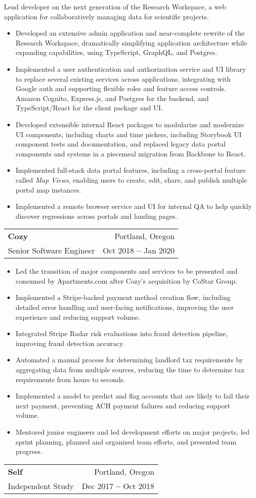\documentclass[letterpaper,11pt]{article}
\makeatletter
\newcommand{\resumeItem}[1]{
  \item\small{
    {#1 \vspace{-2pt}}
  }
}
\newcommand{\resumeSubheading}[4]{
  \item
    \begin{tabular*}{0.97\textwidth}[t]{l@{\extracolsep{\fill}}r}
      \normalsize \textbf{#1} & \small#2 \\
      \small #3 & \small #4 \\
    \end{tabular*}\vspace{-5pt}
}
\newcommand{\resumeItemListStart}{\begin{itemize}}
\newcommand{\resumeItemListEnd}{\end{itemize}\vspace{-5pt}}
\newcommand{\resumeSectionBody}[1]{
  \vspace{0.7em}
  \small #1
  \vspace{-5pt}
}
\makeatother
\begin{document}
      \resumeSectionBody{
        Lead developer on the next generation of the Research Workspace, a web application for collaboratively managing data for scientific projects.
      }
      \resumeItemListStart
        \resumeItem{Developed an extensive admin application and near-complete rewrite of the Research Workspace, dramatically simplifying application architecture while expanding capabilities, using TypeScript, GraphQL, and Postgres.}
        \resumeItem{Implemented a user authentication and authorization service and UI library to replace several existing services across applications, integrating with Google auth and supporting flexible roles and feature access controls. Amazon Cognito, Express.js, and Postgres for the backend, and TypeScript/React for the client package and UI.}
        \resumeItem{Developed extensible internal React packages to modularize and modernize UI components, including charts and time pickers, including Storybook UI component tests and documentation, and replaced legacy data portal components and systems in a piecemeal migration from Backbone to React.}
        \resumeItem{Implemented full-stack data portal features, including a cross-portal feature called \textit{Map Views}, enabling users to create, edit, share, and publish multiple portal map instances.}
        \resumeItem{Implemented a remote browser service and UI for internal QA to help quickly discover regressions across portals and landing pages.}
      \resumeItemListEnd
    \resumeSubheading
      {Cozy}{Portland, Oregon}
      {Senior Software Engineer}{Oct 2018 \textbf{--} Jan 2020}
        \resumeItemListStart
          \resumeItem{Led the transition of major components and services to be presented and consumed by Apartments.com after Cozy's acquisition by CoStar Group.}
          \resumeItem{Implemented a Stripe-backed payment method creation flow, including detailed error handling and user-facing notifications, improving the user experience and reducing support volume.}
          \resumeItem{Integrated Stripe Radar risk evaluations into fraud detection pipeline, improving fraud detection accuracy.}
          \resumeItem{Automated a manual process for determining landlord tax requirements by aggregating data from multiple sources, reducing the time to determine tax requirements from hours to seconds.}
          \resumeItem{Implemented a model to predict and flag accounts that are likely to fail their next payment, preventing ACH payment failures and reducing support volume.}
          \resumeItem{Mentored junior engineers and led development efforts on major projects, led sprint planning, planned and organized team efforts, and presented team progress.}
        \resumeItemListEnd
    \resumeSubheading
      {Self}{Portland, Oregon}
      {Independent Study}{Dec 2017 \textbf{--} Oct 2018}
\end{document}
